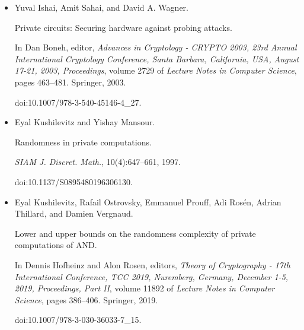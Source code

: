 \begin{itemize}
Robust pseudorandom generators.


In Fedor V. Fomin, Rusins Freivalds, Marta Z. Kwiatkowska, and David
Peleg, editors, \emph{Automata, Languages, and Programming - 40th
International Colloquium, ICALP 2013, Riga, Latvia, July 8-12, 2013,
Proceedings, Part I}, volume 7965 of \emph{Lecture Notes in Computer
Science}, pages 576–588. Springer, 2013.


doi:10.1007/978-3-642-39206-1\_49.





\item[] 
[10]

Yuval Ishai, Amit Sahai, and David A. Wagner.


Private circuits: Securing hardware against probing attacks.


In Dan Boneh, editor, \emph{Advances in Cryptology - CRYPTO 2003,
23rd Annual International Cryptology Conference, Santa Barbara, California,
USA, August 17-21, 2003, Proceedings}, volume 2729 of \emph{Lecture Notes in
Computer Science}, pages 463–481. Springer, 2003.


doi:10.1007/978-3-540-45146-4\_27.





\item[] 
[11]

Eyal Kushilevitz and Yishay Mansour.


Randomness in private computations.


\emph{SIAM J. Discret. Math.}, 10(4):647–661, 1997.


doi:10.1137/S0895480196306130.





\item[] 
[12]

Eyal Kushilevitz, Rafail Ostrovsky, Emmanuel Prouff, Adi Rosén, Adrian
Thillard, and Damien Vergnaud.


Lower and upper bounds on the randomness complexity of private
computations of AND.


In Dennis Hofheinz and Alon Rosen, editors, \emph{Theory of
Cryptography - 17th International Conference, TCC 2019, Nuremberg, Germany,
December 1-5, 2019, Proceedings, Part II}, volume 11892 of \emph{Lecture
Notes in Computer Science}, pages 386–406. Springer, 2019.


doi:10.1007/978-3-030-36033-7\_15.






\end{itemize}
